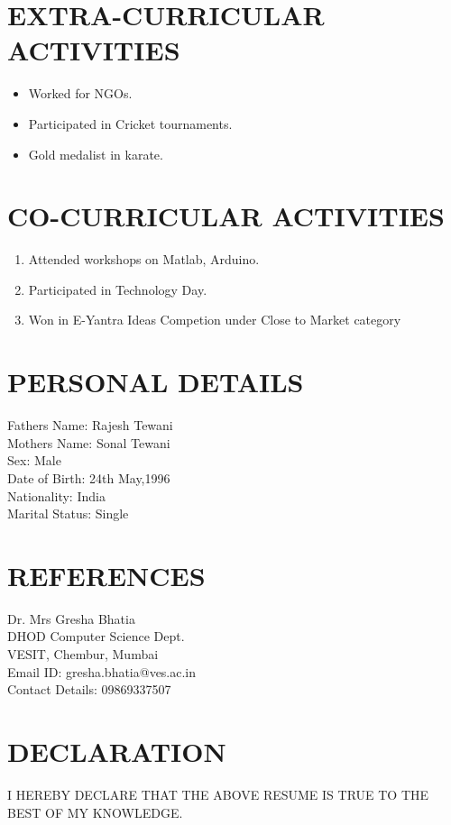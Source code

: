 \documentclass{article}
\begin{document}
\section{EXTRA-CURRICULAR ACTIVITIES}
\begin{itemize}
                \item Worked for NGOs. 
                \item Participated in Cricket tournaments. 
                \item Gold medalist in karate.
\end{itemize}

\section{CO-CURRICULAR ACTIVITIES}
\begin{enumerate}       
                \item Attended workshops on  Matlab, Arduino.
                \item Participated in Technology Day.
                \item Won in E-Yantra Ideas Competion under Close to Market category
\end{enumerate}

\section{PERSONAL DETAILS}
{\selectfont
 Fathers Name: Rajesh Tewani
 \\Mothers Name: Sonal Tewani
 \\Sex: Male
 \\Date of Birth: 24th May,1996
 \\Nationality: India
 \\Marital Status: Single
}
\section{REFERENCES}
{\selectfont
Dr. Mrs Gresha Bhatia
\\DHOD Computer Science Dept.
\\VESIT, Chembur, Mumbai
\\Email ID: gresha.bhatia@ves.ac.in
\\Contact Details: 09869337507
}

\section{DECLARATION}
I HEREBY DECLARE THAT THE ABOVE RESUME IS TRUE TO THE BEST OF MY KNOWLEDGE.
\end{document}
